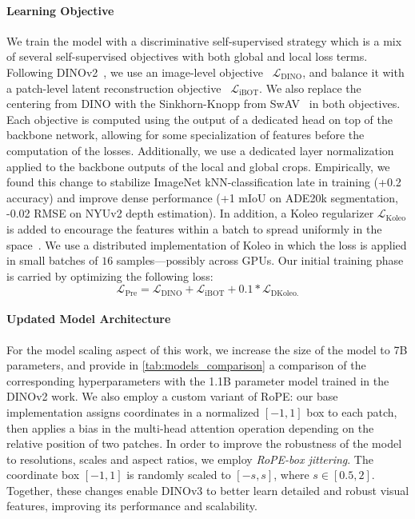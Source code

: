 \paragraph{Learning Objective} We train the model with a discriminative self-supervised strategy which is a mix of several self-supervised objectives with both global and local loss terms. 
Following DINOv2~\citep{oquab2024dinov2},
we use an image-level objective~\citep{caron2021emerging} $\mathcal{L_{\mathrm{DINO}}}$, and balance it with a patch-level latent reconstruction objective~\citep{zhou2021ibot} $\mathcal{L_{\mathrm{iBOT}}}$. 
We also replace the centering from DINO with the Sinkhorn-Knopp from SwAV~\citep{caron2020unsupervised} in both objectives.
Each objective is computed using the output of a dedicated head on top of the backbone network, allowing for some specialization of features before the computation of the losses. 
Additionally, we use a dedicated layer normalization applied to the backbone outputs of the local and global crops. 
Empirically, we found this change to stabilize ImageNet kNN-classification late in training (+0.2 accuracy) and improve dense performance (\eg +1 mIoU on ADE20k segmentation, -0.02 RMSE on NYUv2 depth estimation).
In addition, a Koleo regularizer $\mathcal{L}_{\mathrm{Koleo}}$ is added to encourage the features within a batch to spread uniformly in the space~\citep{sablayrolles2018spreading}. 
We use a distributed implementation of Koleo in which the loss is applied in small batches of $16$ samples---possibly across GPUs.
Our initial training phase is carried by optimizing the following loss:
\begin{equation}
    \mathcal{L_{\mathrm{Pre}}} = \mathcal{L_{\mathrm{DINO}}} + \mathcal{L}_{\mathrm{iBOT}} + 0.1 * \mathcal{L}_{\mathrm{DKoleo}.}
\end{equation}


\paragraph{Updated Model Architecture}
For the model scaling aspect of this work, we increase the size of the model to 7B parameters, and provide in \cref{tab:models_comparison} a comparison of the corresponding hyperparameters with the 1.1B parameter model trained in the DINOv2 work. We also employ a custom variant of RoPE: our base implementation assigns coordinates in a normalized $[-1,1]$ box to each patch, then applies a bias in the multi-head attention operation depending on the relative position of two patches. In order to improve the robustness of the model to resolutions, scales and aspect ratios, we employ \textit{RoPE-box jittering}. The coordinate box $[-1,1]$ is randomly scaled to $[-s,s]$, where $s \in [0.5, 2]$.
Together, these changes enable DINOv3 to better learn detailed and robust visual features, improving its performance and scalability.


